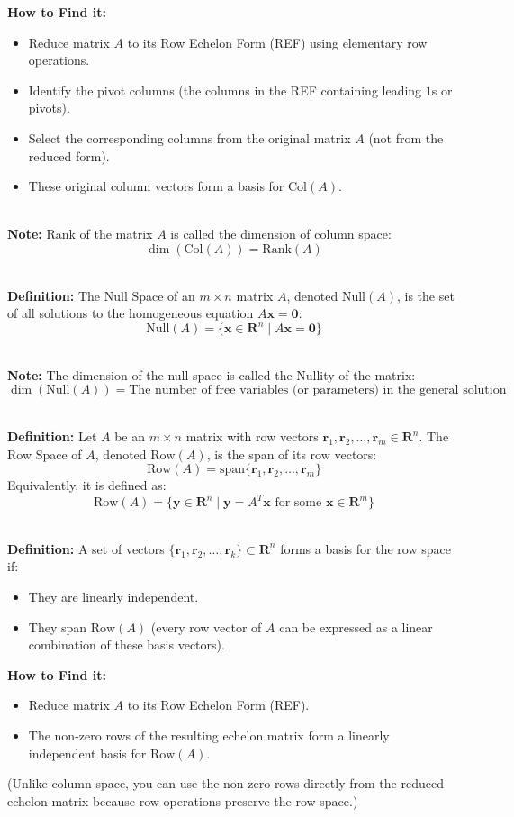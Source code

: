 \documentclass[DIV=20,oneside]{scrartcl}
\newcommand{\note}{
	\noindent\textbf{\\Note: }
}
\newcommand{\deff}{
	\noindent\textbf{\\Definition: }
}
\begin{document}
\textbf{How to Find it: } 
\begin{itemize}
	\item Reduce matrix $A$ to its Row Echelon Form (REF) using elementary row operations.
	\item Identify the pivot columns (the columns in the REF containing leading $1$s or pivots).
	\item Select the corresponding columns from the original matrix $A$ (not from the reduced form). 
	\item These original column vectors form a basis for $\text{Col}(A)$.	
\end{itemize}
\note Rank of the matrix $A$ is called the dimension of column space:$$\dim(\text{Col}(A)) = \text{Rank}(A)$$

\deff The Null Space of an $m \times n$ matrix $A$, denoted $\text{Null}(A)$, is the set of all solutions to the homogeneous equation $A\mathbf{x} = \mathbf{0}$:$$\text{Null}(A) = \{ \mathbf{x} \in \mathbf{R}^n \mid A\mathbf{x} = \mathbf{0} \}$$
\note The dimension of the null space is called the Nullity of the matrix:$$\dim(\text{Null}(A)) = \text{The number of free variables (or parameters) in the general solution}$$

\deff Let $A$ be an $m \times n$ matrix with row vectors $\mathbf{r}_1, \mathbf{r}_2, \dots, \mathbf{r}_m \in \mathbf{R}^n$. The Row Space of $A$, denoted $\text{Row}(A)$, is the span of its row vectors:$$\text{Row}(A) = \text{span}\{\mathbf{r}_1, \mathbf{r}_2, \dots, \mathbf{r}_m\}$$Equivalently, it is defined as:$$\text{Row}(A) = \{ \mathbf{y} \in \mathbf{R}^n \mid \mathbf{y} = A^T\mathbf{x} \text{ for some } \mathbf{x} \in \mathbf{R}^m \}$$

\deff A set of vectors $\{\mathbf{r}_1, \mathbf{r}_2, \dots, \mathbf{r}_k\} \subset \mathbf{R}^n$ forms a basis for the row space if:
\begin{itemize}
	\item They are linearly independent.
	\item They span $\text{Row}(A)$ (every row vector of $A$ can be expressed as a linear combination of these basis vectors).
\end{itemize}
\textbf{How to Find it:}
\begin{itemize}
	\item Reduce matrix $A$ to its Row Echelon Form (REF).
	\item The non-zero rows of the resulting echelon matrix form a linearly independent basis for $\text{Row}(A)$.
\end{itemize}
(Unlike column space, you can use the non-zero rows directly from the reduced echelon matrix because row operations preserve the row space.)
\end{document}

